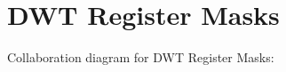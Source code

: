 \hypertarget{group___d_w_t___register___masks}{}\section{D\+WT Register Masks}
\label{group___d_w_t___register___masks}
Collaboration diagram for D\+WT Register Masks\+:

